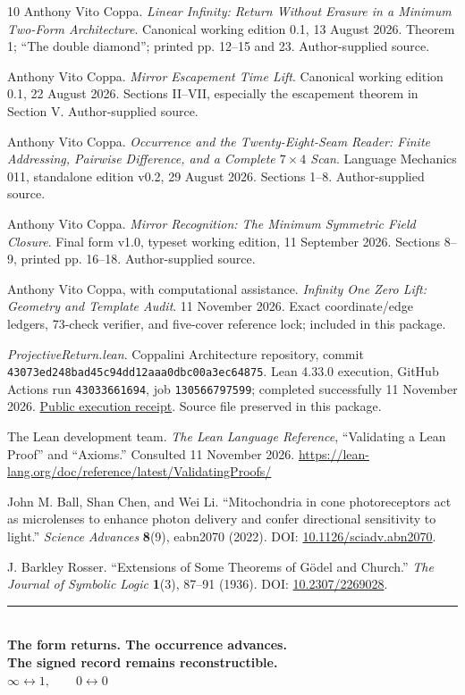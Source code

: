 \documentclass[11pt]{article}
\theoremstyle{definition}\newtheorem{definition}[theorem]{Definition}
\newcommand{\page}{\clearpage}
\begin{document}
\page
\begin{thebibliography}{10}\small
{} Anthony Vito Coppa. \emph{Linear Infinity: Return Without Erasure in a Minimum Two-Form Architecture}. Canonical working edition 0.1, 13 August 2026. Theorem 1; ``The double diamond''; printed pp. 12--15 and 23. Author-supplied source.

 Anthony Vito Coppa. \emph{Mirror Escapement Time Lift}. Canonical working edition 0.1, 22 August 2026. Sections II--VII, especially the escapement theorem in Section V. Author-supplied source.

 Anthony Vito Coppa. \emph{Occurrence and the Twenty-Eight-Seam Reader: Finite Addressing, Pairwise Difference, and a Complete $7\times4$ Scan}. Language Mechanics 011, standalone edition v0.2, 29 August 2026. Sections 1--8. Author-supplied source.

 Anthony Vito Coppa. \emph{Mirror Recognition: The Minimum Symmetric Field Closure}. Final form v1.0, typeset working edition, 11 September 2026. Sections 8--9, printed pp. 16--18. Author-supplied source.

 Anthony Vito Coppa, with computational assistance. \emph{Infinity One Zero Lift: Geometry and Template Audit}. 11 November 2026. Exact coordinate/edge ledgers, 73-check verifier, and five-cover reference lock; included in this package.

 \emph{ProjectiveReturn.lean}. Coppalini Architecture repository, commit \texttt{43073ed248\allowbreak bad45c94dd\allowbreak12aaa0dbc0\allowbreak0a3ec64875}. Lean 4.33.0 execution, GitHub Actions run \texttt{43033661694}, job \texttt{130566797599}; completed successfully 11 November 2026. \href{https://github.com/Coppalini-Architecture/coppalini-architecture/actions/runs/43033661694}{Public execution receipt}. Source file preserved in this package.

 The Lean development team. \emph{The Lean Language Reference}, ``Validating a Lean Proof'' and ``Axioms.'' Consulted 11 November 2026. \url{https://lean-lang.org/doc/reference/latest/ValidatingProofs/}

 John M. Ball, Shan Chen, and Wei Li. ``Mitochondria in cone photoreceptors act as microlenses to enhance photon delivery and confer directional sensitivity to light.'' \emph{Science Advances} \textbf{8}(9), eabn2070 (2022). DOI: \href{https://doi.org/10.1126/sciadv.abn2070}{10.1126/sciadv.abn2070}.

 J. Barkley Rosser. ``Extensions of Some Theorems of G\"odel and Church.'' \emph{The Journal of Symbolic Logic} \textbf{1}(3), 87--91 (1936). DOI: \href{https://doi.org/10.2307/2269028}{10.2307/2269028}.
\end{thebibliography}

\vfill
\begin{center}
{\color{gold}\rule{.62\linewidth}{.4pt}}\\[12pt]
\textbf{The form returns. The occurrence advances.\\The signed record remains reconstructible.}\\[12pt]
$\displaystyle\infty\longleftrightarrow1,\qquad0\longleftrightarrow0$
\end{center}
\end{document}
